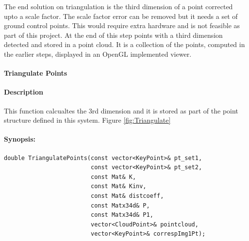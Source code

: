 


The end solution on triangulation is the third dimension of a point corrected upto a scale factor. 
The scale factor error can be removed but it needs a set of ground control points. 
This would require extra hardware and is not feasible as part of this project.
At the end of this step points with a third dimension detected and stored in a point cloud. It is a collection of the points, computed in the earlier steps, displayed in an OpenGL implemented viewer.
\pagebreak
\paragraph{Triangulate Points}
\paragraph{Description}
 This function calcualtes the 3rd dimension and it is stored as part of the point structure defined in this system. Figure \ref{fig:Triangulate}
\paragraph{Synopsis:}
\begin{lstlisting}
double TriangulatePoints(const vector<KeyPoint>& pt_set1, 
                         const vector<KeyPoint>& pt_set2, 
                         const Mat& K,
                         const Mat& Kinv,
                         const Mat& distcoeff,
                         const Matx34d& P,
                         const Matx34d& P1,
                         vector<CloudPoint>& pointcloud,
                         vector<KeyPoint>& correspImg1Pt);
 \end{lstlisting}

